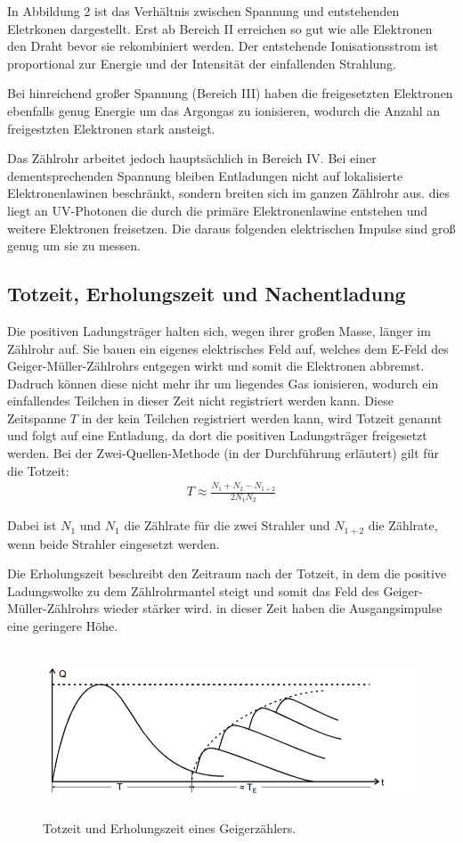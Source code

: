  In Abbildung 2 ist das Verhältnis zwischen Spannung und entstehenden Eletrkonen dargestellt. Erst ab Bereich II
erreichen so gut wie alle Elektronen den Draht bevor sie rekombiniert werden. Der entstehende Ionisationsstrom ist
proportional zur Energie und der Intensität der einfallenden Strahlung.

Bei hinreichend großer Spannung (Bereich III) haben die freigesetzten Elektronen ebenfalls genug Energie um das Argongas zu ionisieren,
wodurch die Anzahl an freigestzten Elektronen stark ansteigt.

Das Zählrohr arbeitet jedoch hauptsächlich in Bereich IV. Bei einer dementsprechenden Spannung bleiben Entladungen nicht
auf lokalisierte Elektronenlawinen beschränkt, sondern breiten sich im ganzen Zählrohr aus. dies liegt
an UV-Photonen die durch die primäre Elektronenlawine entstehen und weitere Elektronen freisetzen. Die
daraus folgenden elektrischen Impulse sind groß genug um sie zu messen.

\subsection{Totzeit, Erholungszeit und Nachentladung}

Die positiven Ladungsträger halten sich, wegen ihrer großen Masse, länger im Zählrohr auf. Sie bauen ein eigenes
elektrisches Feld auf, welches dem E-Feld des Geiger-Müller-Zählrohrs entgegen wirkt und somit die Elektronen abbremst.
Dadruch können diese nicht mehr ihr um liegendes Gas ionisieren, wodurch ein einfallendes Teilchen in dieser Zeit
nicht registriert werden kann. Diese Zeitspanne $T$ in der kein Teilchen registriert werden kann, wird Totzeit genannt
und folgt auf eine Entladung, da dort die positiven Ladungsträger freigesetzt werden.
Bei der Zwei-Quellen-Methode (in der Durchführung erläutert) gilt für die Totzeit:
\begin{align}
  T \approx \frac{N_1 + N_2- N_{1+2}}{2 N_1 N_2}
\end{align}

Dabei ist $N_1$ und $N_1$ die Zählrate für die zwei Strahler und $N_{1+2}$ die Zählrate,
wenn beide Strahler eingesetzt werden.

Die Erholungszeit beschreibt den Zeitraum nach der Totzeit, in dem die positive Ladungswolke zu dem Zählrohrmantel steigt und somit
das Feld des Geiger-Müller-Zählrohrs wieder stärker wird. in dieser Zeit haben die Ausgangsimpulse eine geringere Höhe.


\begin{figure}[H]
  \centering
  \includegraphics[height=5cm]{totzeit.PNG}
  \caption{Totzeit und Erholungszeit eines Geigerzählers. \cite{sample}}
  \label{fig:totzeit}
\end{figure}

